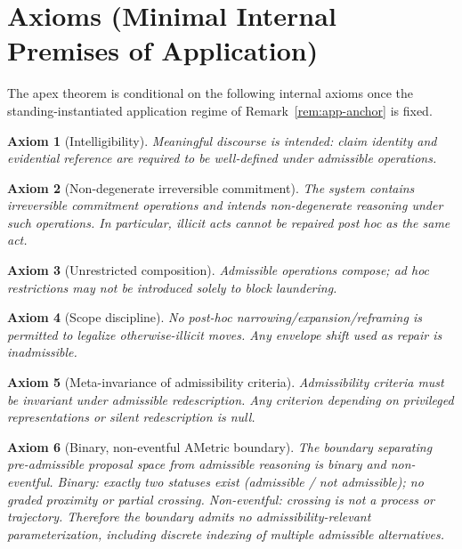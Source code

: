 \documentclass[12pt]{article}
\newtheorem{axiom}{Axiom}
\begin{document}
\section{Axioms (Minimal Internal Premises of Application)}
\label{sec:axioms}

The apex theorem is conditional on the following internal axioms once the standing-instantiated application regime of Remark~\ref{rem:app-anchor} is fixed.

\begin{axiom}[Intelligibility]
\label{ax:intell}
Meaningful discourse is intended: claim identity and evidential reference are required to be well-defined under admissible operations.
\end{axiom}

\begin{axiom}[Non-degenerate irreversible commitment]
\label{ax:irr}
The system contains irreversible commitment operations and intends non-degenerate reasoning under such operations. In particular,
illicit acts cannot be repaired post hoc \emph{as the same act}.
\end{axiom}

\begin{axiom}[Unrestricted composition]
\label{ax:comp}
Admissible operations compose; ad hoc restrictions may not be introduced solely to block laundering.
\end{axiom}

\begin{axiom}[Scope discipline]
\label{ax:scope}
No post-hoc narrowing/expansion/reframing is permitted to legalize otherwise-illicit moves. Any envelope shift used as repair is inadmissible.
\end{axiom}

\begin{axiom}[Meta-invariance of admissibility criteria]
\label{ax:miax}
Admissibility criteria must be invariant under admissible redescription. Any criterion depending on privileged representations or silent redescription is null.
\end{axiom}

\begin{axiom}[Binary, non-eventful AMetric boundary]
\label{ax:ametric}
The boundary separating pre-admissible proposal space from admissible reasoning is \emph{binary} and \emph{non-eventful}.
Binary: exactly two statuses exist (admissible / not admissible); no graded proximity or partial crossing.
Non-eventful: crossing is not a process or trajectory.
Therefore the boundary admits no admissibility-relevant parameterization, including discrete indexing of multiple admissible alternatives.
\end{axiom}
\end{document}
